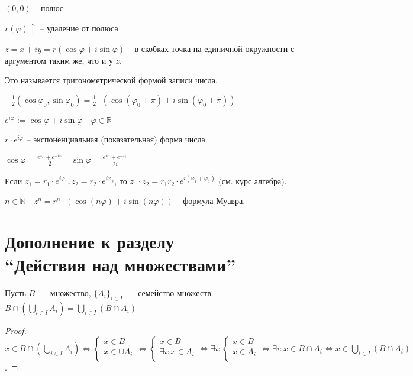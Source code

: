 \documentclass{book}
\newcommand\N{\ensuremath{\mathbb{N}}}
\newcommand\R{\ensuremath{\mathbb{R}}}
\renewcommand\phi{\varphi}
\theoremstyle{definition}
\begin{document}
    $(0,0)$ -- полюс

    $r(\phi) \uparrow$ -- удаление от полюса

    $z = x+iy = r(\cos \phi + i\sin \phi)$ -- в скобках точка на единичной окружности с аргументом таким же, что и у $z$.

    Это называется тригонометрической формой записи числа.

    $-\frac{1}{2}(\cos \phi_0, \sin \phi_0) = \frac{1}{2} \cdot  \left( \cos (\phi_0+\pi ) + i\sin (\phi_0+\pi ) \right) $

    $e^{i\phi}:=\cos \phi + i\sin\phi\quad \phi\in \R$

    $r\cdot e^{i\phi}$ -- экспоненциальная (показательная) форма числа.

    $\cos \phi = \frac{e^{i\phi} + e^{-i\phi}}{2}\quad \sin \phi = \frac{e^{i\phi} + e^{-i\phi}}{2i}$

    Если $z_1 = r_1 \cdot  e^{i\phi_1}, z_2 = r_2 \cdot  e^{i\phi_2}$, то $z_1\cdot z_2 = r_1r_2\cdot e^{i\left( \phi_1 + \phi_2 \right) }$ (см. курс алгебра).

    $n\in \N \quad z^n = r^n \cdot  (\cos (n\phi) + i\sin(n\phi))$ -- формула Муавра.

    \section{Дополнение к разделу\\``Действия над множествами''}

    \begin{statement}
        Пусть $B$~--- множество, $\{A_i\}_{i\in I}$~--- семейство множеств. \\
        $B\cap \left( \bigcup\limits_{i \in  I} A_i \right)  = \bigcup\limits_{i \in  I} \left( B\cap A_i \right) $
    \end{statement}
    \begin{proof}
        $x\in B\cap \left( \bigcup\limits_{i \in  I} A_i \right) \iff \begin{cases}
            x\in B\\
            x\in \cup A_i\\
        \end{cases} \iff  
        \begin{cases}
            x\in B\\
            \exists i:x\in A_i\\
        \end{cases} \iff  \exists i: 
        \begin{cases}
            x\in B\\
            x\in A_i\\
        \end{cases} \iff \exists i: x\in B\cap A_i \iff x\in  \bigcup\limits_{i \in  I} \left( B\cap A_i \right)$.
        \end{proof}
\end{document}
